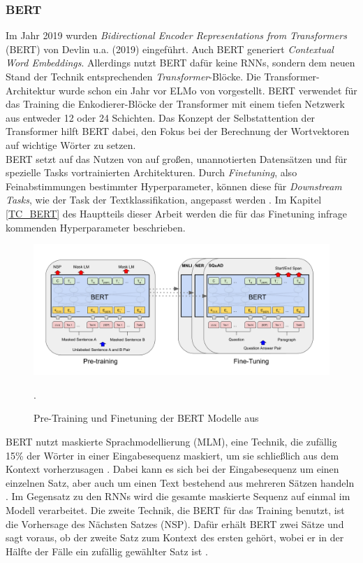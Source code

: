 \documentclass[ngerman]{ttlab-qualify}
\begin{document}
\subsubsection{BERT}
Im Jahr 2019 wurden \textit{Bidirectional Encoder Representations from Transformers} (BERT) von Devlin u.a. (2019) eingeführt. Auch BERT generiert \textit{Contextual Word Embeddings}. Allerdings nutzt BERT dafür keine RNNs, sondern dem neuen Stand der Technik entsprechenden \textit{Transformer}-Blöcke. Die Transformer-Architektur wurde schon ein Jahr vor ELMo von \textcite{https://doi.org/10.48550/arxiv.1706.03762} vorgestellt. BERT verwendet für das Training die Enkodierer-Blöcke der Transformer mit einem tiefen Netzwerk aus entweder 12 oder 24 Schichten. Das Konzept der Selbstattention der Transformer hilft BERT dabei, den Fokus bei der Berechnung der Wortvektoren auf wichtige Wörter zu setzen.\\
BERT setzt auf das Nutzen von auf großen, unannotierten Datensätzen und für spezielle Tasks vortrainierten Architekturen. Durch \textit{Finetuning}, also Feinabstimmungen bestimmter Hyperparameter, können diese für \textit{Downstream Tasks}, wie der Task der Textklassifikation, angepasst werden \parencite{devlin-etal-2019-bert}. Im Kapitel \ref{TC_BERT} des Hauptteils dieser Arbeit werden die für das Finetuning infrage kommenden Hyperparameter beschrieben.
\begin{figure}[H]
\begin{center}
\includegraphics[width=16cm]{grafiken/BERT_Architektur.jpeg}
\caption[Pre-Training und Finetuning der BERT Modelle]{Pre-Training und Finetuning der BERT Modelle aus \textcite[3]{devlin-etal-2019-bert}}.
\label{BERT_Architektur} 
\end{center}
\end{figure}
\noindent BERT nutzt maskierte Sprachmodellierung (MLM), eine Technik, die zufällig 15\% der Wörter in einer Eingabesequenz maskiert, um sie schließlich aus dem Kontext vorherzusagen \parencite{devlin-etal-2019-bert}. Dabei kann es sich bei der Eingabesequenz um einen einzelnen Satz, aber auch um einen Text bestehend aus mehreren Sätzen handeln \parencite{devlin-etal-2019-bert}. Im Gegensatz zu den RNNs wird die gesamte maskierte Sequenz auf einmal im Modell verarbeitet. Die zweite Technik, die BERT für das Training benutzt, ist die Vorhersage des Nächsten Satzes (NSP). Dafür erhält BERT zwei Sätze und sagt voraus, ob der zweite Satz zum Kontext des ersten gehört, wobei er in der Hälfte der Fälle ein zufällig gewählter Satz ist \parencite{devlin-etal-2019-bert}.\\
\end{document}

